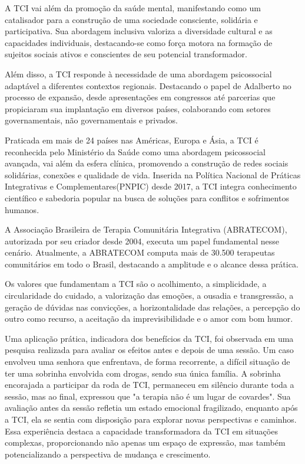 A TCI vai além da promoção da saúde mental, manifestando como um catalisador para a construção de uma sociedade consciente, solidária e participativa. Sua abordagem inclusiva valoriza a diversidade cultural e as capacidades individuais, destacando-se como força motora na formação de sujeitos sociais ativos e conscientes de seu potencial transformador.\cite{BARRETO}

Além disso, a TCI responde à necessidade de uma abordagem psicossocial adaptável a diferentes contextos regionais. Destacando o papel de Adalberto no processo de expansão, desde apresentações em congressos até parcerias que propiciaram sua implantação em diversos países, colaborando com setores governamentais, não governamentais e privados.\cite{GOMES}

Praticada em mais de 24 países nas Américas, Europa e Ásia, a TCI é reconhecida pelo Ministério da Saúde como uma abordagem psicossocial avançada, vai além da esfera clínica, promovendo a construção de redes sociais solidárias, conexões e qualidade de vida. Inserida na Política Nacional de Práticas Integrativas e Complementares(PNPIC) desde 2017, a TCI integra conhecimento científico e sabedoria popular na busca de soluções para conflitos e sofrimentos humanos.\cite{ABRATECOM}

A Associação Brasileira de Terapia Comunitária Integrativa (ABRATECOM), autorizada por seu criador desde 2004, executa um papel fundamental nesse cenário. Atualmente, a ABRATECOM computa mais de 30.500 terapeutas comunitários em todo o Brasil, destacando a amplitude e o alcance dessa prática.\cite{SILVAFRANCO}

Os valores que fundamentam a TCI são o acolhimento, a simplicidade, a circularidade do cuidado, a valorização das emoções, a ousadia e transgressão, a geração de dúvidas nas convicções, a horizontalidade das relações, a percepção do outro como recurso, a aceitação da imprevisibilidade e o amor com bom humor.\cite{SILVA}

Uma aplicação prática, indicadora dos benefícios da TCI, foi observada em uma pesquisa realizada para avaliar os efeitos antes e depois de uma sessão. Um caso envolveu uma senhora que enfrentava, de forma recorrente, a difícil situação de ter uma sobrinha envolvida com drogas, sendo sua única família. A sobrinha encorajada a participar da roda de TCI, permaneceu em silêncio durante toda a sessão, mas ao final, expressou que "a terapia não é um lugar de covardes". Sua avaliação antes da sessão refletia um estado emocional fragilizado, enquanto após a TCI, ela se sentia com disposição para explorar novas perspectivas e caminhos. Essa experiência destaca a capacidade transformadora da TCI em situações complexas, proporcionando não apenas um espaço de expressão, mas também potencializando a perspectiva de mudança e crescimento. \cite{LEITEePALOS}

